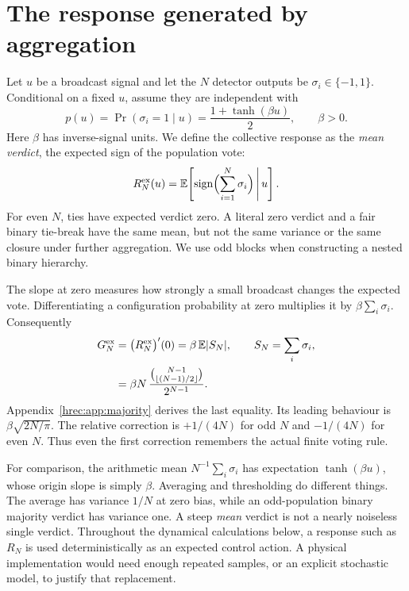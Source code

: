 \section{The response generated by aggregation}
\label{hrec:sec:aggregation}
Let \(u\) be a broadcast signal and let the \(N\) detector outputs be \(\sigma_i\in\{-1,1\}\). Conditional on a fixed \(u\), assume they are independent with
\begin{equation}
 p(u)=\Pr(\sigma_i=1\mid u)=\frac{1+\tanh(\beta u)}2,\qquad \beta>0.
 \label{hrec:eq:detector}
\end{equation}
Here \(\beta\) has inverse-signal units. We define the collective response as the \emph{mean verdict}, the expected sign of the population vote:
\begin{equation}
 R_N^{\rm ex}(u)=\mathbb E\!\left[\operatorname{sign}\Bigl(\sum_{i=1}^N\sigma_i\Bigr)\,\middle|\,u\right].
 \label{hrec:eq:majority}
\end{equation}
For even \(N\), ties have expected verdict zero. A literal zero verdict and a fair binary tie-break have the same mean, but not the same variance or the same closure under further aggregation. We use odd blocks when constructing a nested binary hierarchy.

The slope at zero measures how strongly a small broadcast changes the expected vote. Differentiating a configuration probability at zero multiplies it by \(\beta\sum_i\sigma_i\). Consequently
\begin{align}
 G_N^{\rm ex}
 &=\bigl(R_N^{\rm ex}\bigr)'(0)=\beta\,\mathbb E|S_N|,\qquad S_N=\sum_i\sigma_i,\nonumber\\
 &=\beta N\,\frac{\binom{N-1}{\lfloor(N-1)/2\rfloor}}{2^{N-1}}.
 \label{hrec:eq:exact-slope}
\end{align}
Appendix~\ref{hrec:app:majority} derives the last equality. Its leading behaviour is \(\beta\sqrt{2N/\pi}\). The relative correction is \(+1/(4N)\) for odd \(N\) and \(-1/(4N)\) for even \(N\). Thus even the first correction remembers the actual finite voting rule.

For comparison, the arithmetic mean \(N^{-1}\sum_i\sigma_i\) has expectation \(\tanh(\beta u)\), whose origin slope is simply \(\beta\). Averaging and thresholding do different things. The average has variance \(1/N\) at zero bias, while an odd-population binary majority verdict has variance one. A steep \emph{mean} verdict is not a nearly noiseless single verdict. Throughout the dynamical calculations below, a response such as \(R_N\) is used deterministically as an expected control action. A physical implementation would need enough repeated samples, or an explicit stochastic model, to justify that replacement.

